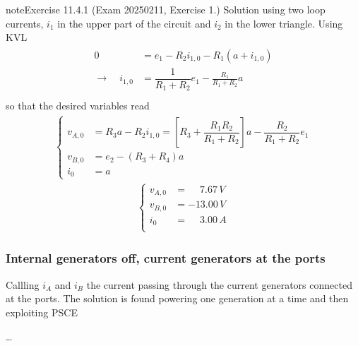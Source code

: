 \documentclass[letterpaper,10pt,english]{jupyterBook}
\begin{document}
\begin{sphinxadmonition}{note}{Exercise 11.4.1 (Exam 2025\sphinxhyphen{}02\sphinxhyphen{}11, Exercise 1.)}
\sphinxAtStartPar
Solution using two loop currents, \(i_1\) in the upper part of the circuit and \(i_2\) in the lower triangle. Using KVL
\begin{equation*}
\begin{split}\begin{aligned}
  0 & = e_1 - R_2 i_{1,0} - R_1 (a + i_{1,0}) \\
  \rightarrow \quad i_{1,0} & = \dfrac{1}{R_1+R_2} e_1 - \frac{R_1}{R_1 + R_2} a \\
\end{aligned}\end{split}
\end{equation*}
\sphinxAtStartPar
so that the desired variables read
\begin{equation*}
\begin{split}\begin{cases}
  v_{A,0} & = R_3 a - R_2 i_{1,0} = \left[ R_3 + \dfrac{R_1 R_2}{R_1 + R_2} \right] a - \dfrac{R_2}{R_1+R_2} e_1 \\
  v_{B,0} & = e_2 - (R_3 + R_4) a \\
  i_{0} & = a
\end{cases}\end{split}
\end{equation*}\begin{equation*}
\begin{split}\begin{cases}
 v_{A,0} & = \quad\ 7.67 \, V \\
 v_{B,0} & =      -13.00 \, V \\
   i_{0} & = \quad\ 3.00 \, A \\
\end{cases}\end{split}
\end{equation*}
\begin{figure}[htbp]
\centering

\noindent{}
\end{figure}
\subsubsection*{Internal generators off, current generators at the ports}

\sphinxAtStartPar
Callling \(i_A\) and \(i_B\) the current passing through the current generators connected at the ports. The solution is found powering one generation at a time and then exploiting PSCE

\sphinxAtStartPar
{} …


\end{sphinxadmonition}
\end{document}

